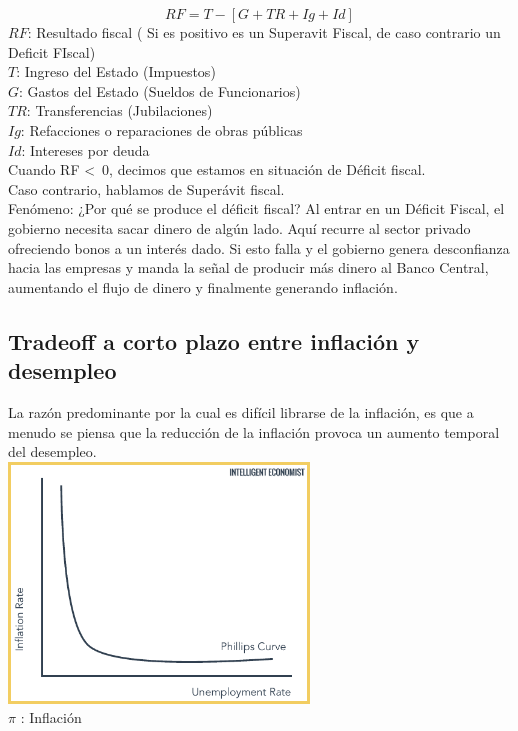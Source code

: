 \documentclass{report}
\begin{document}
$$RF = T  - [ G + TR + Ig + Id ]$$
$RF$: Resultado fiscal ( Si es positivo es un Superavit Fiscal, de caso contrario un Deficit FIscal) \\
$T$: Ingreso del Estado (Impuestos) \\
$G$: Gastos del Estado (Sueldos de Funcionarios) \\
$TR$: Transferencias (Jubilaciones) \\
$Ig$: Refacciones o reparaciones de obras públicas \\
$Id$: Intereses por deuda \\

Cuando RF \textless \ 0, decimos que estamos en situación de Déficit fiscal. \\
Caso contrario, hablamos de Superávit fiscal. \\

Fenómeno: ¿Por qué se produce el déficit fiscal? Al entrar en un Déficit Fiscal, el gobierno necesita sacar dinero de algún lado. Aquí recurre al sector privado ofreciendo bonos a un interés dado. Si esto falla y el gobierno genera desconfianza hacia las empresas y manda la señal de producir más dinero al Banco Central, aumentando el flujo de dinero y finalmente generando inflación.

\subsection{Tradeoff a corto plazo entre inflación y desempleo}
La razón predominante por la cual es difícil librarse de la inflación, es que a menudo se piensa que la reducción de la inflación provoca un aumento temporal del desempleo. \\
\includegraphics[width=8cm]{../Assets/phillips-curve.png} \\

$\pi$ : Inflación \\
\end{document}
